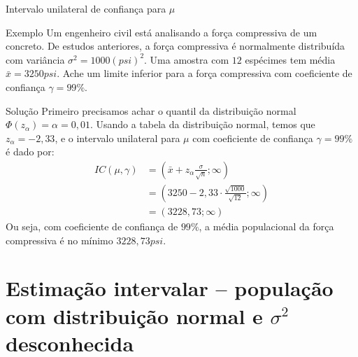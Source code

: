 \documentclass[8pt]{beamer}
\begin{document}
\begin{frame}{Intervalo unilateral de confiança para $\mu$}

\small

\begin{block}{Exemplo}
	Um engenheiro civil está analisando a força compressiva de um concreto. De estudos anteriores, a força compressiva é normalmente distribuída com variância $\sigma^2 = 1000(psi)^2$. Uma amostra com $12$ espécimes tem média $\bar{x} = 3250 psi.$ Ache um limite inferior para a força compressiva com coeficiente de confiança $\gamma=99\%$.
\end{block}

\begin{block}{Solução}
	Primeiro precisamos achar o quantil da distribuição normal $\Phi\left( z_\alpha \right) = \alpha = 0,01$. Usando a tabela da distribuição normal, temos que $z_\alpha = -2,33$, e o intervalo unilateral para $\mu$ com coeficiente de confiança $\gamma=99\%$ é dado por:
	\begin{align*}
	IC(\mu, \gamma) &= \left( \bar{x} + z_\alpha \frac{\sigma}{\sqrt{n}}; \infty\right)\\
	&= \left( 3250 - 2,33 \cdot \frac{\sqrt{1000}}{\sqrt{12}} ; \infty \right)\\
	&= \left( 3228,73; \infty \right)
	\end{align*}
	Ou seja, com coeficiente de confiança de $99\%$, a média populacional da força compressiva é no mínimo $3228,73 psi$.
\end{block}

\normalsize

\end{frame}

\section{Estimação intervalar -- população com distribuição normal e $\sigma^2$ desconhecida}
\end{document}

